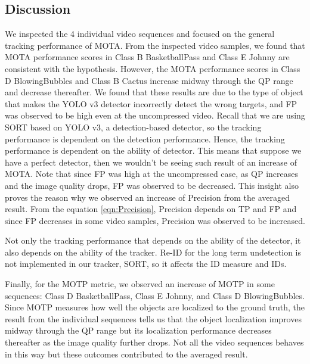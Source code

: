 \subsection{Discussion}
We inspected the 4 individual video sequences and focused on the general tracking performance of MOTA. From the inspected video samples, we found that MOTA performance scores in Class B BasketballPass and Class E Johnny are consistent with the hypothesis. However, the MOTA performance scores in Class D BlowingBubbles and Class B Cactus increase midway through the QP range and decrease thereafter. We found that these results are due to the type of object that makes the YOLO v3 detector incorrectly detect the wrong targets, and FP was observed to be high even at the uncompressed video. Recall that we are using SORT based on YOLO v3, a detection-based detector, so the tracking performance is dependent on the detection performance. Hence, the tracking performance is dependent on the ability of detector. This means that suppose we have a perfect detector, then we wouldn't be seeing such result of an increase of MOTA. Note that since FP was high at the uncompressed case, as QP increases and the image quality drops, FP was observed to be decreased. This insight also proves the reason why we observed an increase of Precision from the averaged result. From the equation \ref{eqn:Precision}, Precision depends on TP and FP and since FP decreases in some video samples, Precision was observed to be increased.

Not only the tracking performance that depends on the ability of the detector, it also depends on the ability of the tracker. Re-ID for the long term undetection is not implemented in our tracker, SORT, so it affects the ID measure and IDs.

Finally, for the MOTP metric, we observed an increase of MOTP in some sequences: Class D BasketballPass, Class E Johnny, and Class D BlowingBubbles. Since MOTP measures how well the objects are localized to the ground truth, the result from the individual sequences tells us that the object localization improves midway through the QP range but its localization performance decreases thereafter as the image quality further drops. Not all the video sequences behaves in this way but these outcomes contributed to the averaged result.